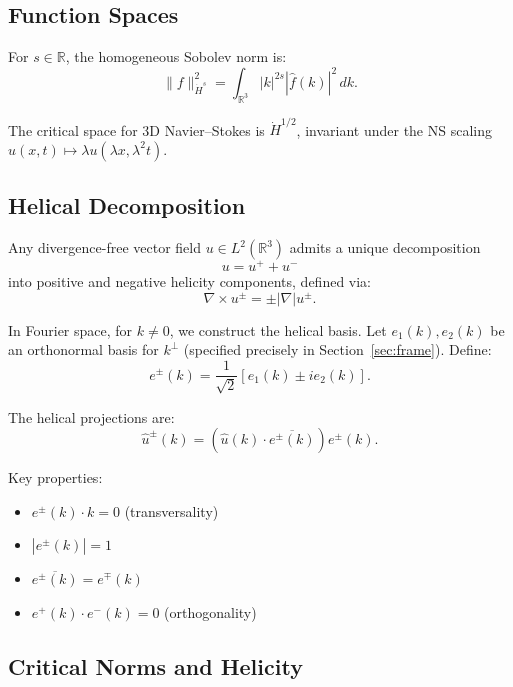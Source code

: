 \documentclass[11pt]{article}
\theoremstyle{definition}
\newcommand{\R}{\mathbb{R}}
\begin{document}
\subsection{Function Spaces}

For $s \in \R$, the homogeneous Sobolev norm is:
\begin{equation}
\|f\|_{\dot{H}^s}^2 = \int_{\R^3} |k|^{2s} |\hat{f}(k)|^2 \, dk.
\end{equation}

The critical space for 3D Navier--Stokes is $\dot{H}^{1/2}$, invariant under the NS scaling $u(x,t) \mapsto \lambda u(\lambda x, \lambda^2 t)$.

\subsection{Helical Decomposition}

Any divergence-free vector field $u \in L^2(\R^3)$ admits a unique decomposition
\begin{equation}
u = u^+ + u^-
\end{equation}
into positive and negative helicity components, defined via:
\begin{equation}
\nabla \times u^\pm = \pm |\nabla| u^\pm.
\end{equation}

In Fourier space, for $k \neq 0$, we construct the helical basis. Let $e_1(k), e_2(k)$ be an orthonormal basis for $k^\perp$ (specified precisely in Section~\ref{sec:frame}). Define:
\begin{equation}
e^\pm(k) = \frac{1}{\sqrt{2}}\left[e_1(k) \pm i e_2(k)\right].
\end{equation}

The helical projections are:
\begin{equation}
\hat{u}^\pm(k) = \left(\hat{u}(k) \cdot \overline{e^\pm(k)}\right) e^\pm(k).
\end{equation}

Key properties:
\begin{itemize}
\item $e^\pm(k) \cdot k = 0$ (transversality)
\item $|e^\pm(k)| = 1$
\item $\overline{e^\pm(k)} = e^\mp(k)$
\item $e^+(k) \cdot e^-(k) = 0$ (orthogonality)
\end{itemize}

\subsection{Critical Norms and Helicity}
\end{document}

